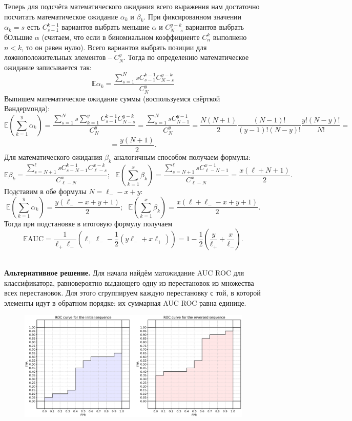 \documentclass[12pt,a4paper]{article}
\begin{document}
\begin{esSolution}
Теперь для подсчёта математического ожидания всего выражения нам достаточно посчитать математическое ожидание $\alpha_k$ и $\beta_k$.
При фиксированном значении $\alpha_k = s$ есть $C_{s - 1}^{k - 1}$ вариантов выбрать меньшие $\alpha$ и $C_{N - s}^{y - k}$ вариантов выбрать бОльшие $\alpha$ (считаем, что если в биномиальном коэффициенте $C_n^k$ выполнено $n < k$, то он равен нулю).
Всего вариантов выбрать позиции для ложноположительных элементов -- $C_{N}^y.$
Тогда по определению математическое ожидание записывается так:
$$
\mathbb{E}\alpha_k = \frac{\sum\limits_{s = 1}^{N}sC_{s - 1}^{k - 1}C_{N - s}^{y - k}}{C_{N}^y}
$$
Выпишем математическое ожидание суммы (воспользуемся свёрткой Вандермонда):
$$
\mathbb{E}\left(\sum\limits_{k = 1}^y \alpha_k\right) = \frac{\sum\limits_{s = 1}^N s \sum\limits_{k = 1}^y C_{s - 1}^{k - 1}C_{N - s}^{y - k}}{C_{N}^y} = \frac{\sum\limits_{s = 1}^N s C_{N - 1}^{y - 1}}{C_{N}^y} = \frac{N(N + 1)}{2} \frac{(N - 1)!}{(y - 1)! (N - y)!} \frac{y! (N - y)!}{N!} =$$
$$= \frac{y(N + 1)}{2}.
$$
Для математического ожидания $\beta_k$ аналогичным способом получаем формулы:
$$
\mathbb{E}\beta_k = \frac{\sum\limits_{s = N + 1}^{\ell} s C_{s - N - 1}^{k - 1} C_{\ell - s}^{x - k}}{C_{\ell - N}^x};~~~\mathbb{E}\left(\sum\limits_{k = 1}^x \beta_k\right) = \frac{\sum\limits_{s = N + 1}^{\ell}s C_{\ell - N - 1}^{x - 1}}{C_{\ell - N}^x} = \frac{x(\ell + N + 1)}{2}.
$$
Подставим в обе формулы $N = \ell_{-} - x + y:$
$$
\mathbb{E}\left(\sum\limits_{k = 1}^y \alpha_k\right) = \frac{y(\ell_{-} - x + y + 1)}{2};~~~\mathbb{E}\left(\sum\limits_{k = 1}^x \beta_k\right) = \frac{x(\ell + \ell_{-} - x + y + 1)}{2}.
$$
Тогда при подстановке в итоговую формулу получаем
$$
\mathbb{E}\text{AUC} = \frac{1}{\ell_{+}\ell_{-}}\left(\ell_{+}\ell_{-} - \frac{1}{2}\left(y\ell_{-} + x\ell_{+}\right) \right) = 1 - \frac{1}{2}\left(\frac{y}{\ell_{+}} + \frac{x}{\ell_{-}}\right).
$$
\end{esSolution}\\

\noindent \textbf{Альтернативное решение.}
Для начала найдём матожидание AUC ROC для классификатора, равновероятно выдающего одну из перестановок из множества всех перестановок. Для этого сгруппируем каждую перестановку с той, в которой элементы идут в обратном порядке: их суммарная AUC ROC равна единице.

\begin{figure}[h]
\centering
\includegraphics[width=\textwidth]{./img/pic1.eps}
\end{figure}
\end{document}
